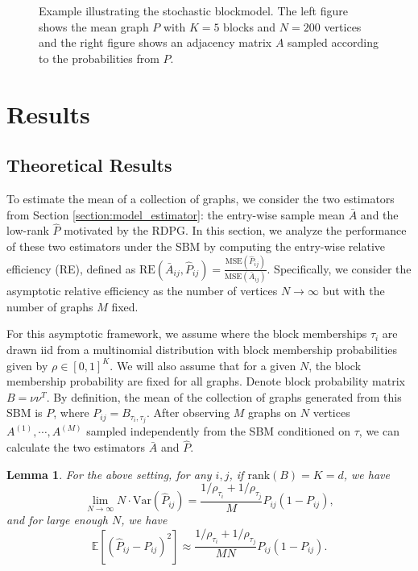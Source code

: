 \documentclass[a4paper]{article}
\newtheorem{lemma}[fact]{Lemma}
\newcommand{\Ex}{\mathbb{E}}
\begin{document}
\begin{figure}
\begin{subfigure}{.5\textwidth}
\end{subfigure}
\caption{Example illustrating the stochastic blockmodel. The left figure shows the mean graph $P$ with $K = 5$ blocks and $N=200$ vertices and the right figure shows an adjacency matrix $A$ sampled according to the probabilities from $P$.}
\label{fig:SBM_example}
\end{figure}



\section{Results}

\subsection{Theoretical Results}
\label{section:theoretical_result}
To estimate the mean of a collection of graphs, we consider the two estimators from Section \ref{section:model_estimator}: the entry-wise sample mean $\bar{A}$ and the low-rank $\hat{P}$ motivated by the RDPG.
In this section, we analyze the performance of these two estimators under the SBM by computing the entry-wise relative efficiency (RE), defined as $\mathrm{RE}(\bar{A}_{ij}, \hat{P}_{ij}) = \frac{\mathrm{MSE}(\hat{P}_{ij})}{\mathrm{MSE}(\bar{A}_{ij})}$.
Specifically, we consider the asymptotic relative efficiency as the number of vertices $N\to\infty$ but with the number of graphs $M$ fixed.

For this asymptotic framework, we assume where the block memberships $\tau_i$ are drawn iid from a multinomial distribution with block membership probabilities given by $\rho\in[0,1]^K$.
We will also assume that for a given $N$, the block membership probability are fixed for all graphs.
Denote block probability matrix $B = \nu \nu^T$. 
By definition, the mean of the collection of graphs generated from this SBM is $P$, where $P_{ij} = B_{\tau_i, \tau_j}$. After observing $M$ graphs on $N$ vertices $A^{(1)}, \cdots, A^{(M)}$ sampled independently from the SBM conditioned on $\tau$, we can calculate the two estimators $\bar{A}$ and $\hat{P}$.

\begin{lemma}
\label{lm:VarPhat}
For the above setting, for any $i, j$, if $\mathrm{rank}(B)=K=d$, we have
\[
	\lim_{N \to \infty} N \cdot \mathrm{Var}(\hat{P}_{ij}) =
    \frac{1/\rho_{\tau_i} + 1/\rho_{\tau_j}}{M} P_{ij} (1 - P_{ij}),
\]
and for large enough $N$, we have
\[
	\Ex[(\hat{P}_{ij} - P_{ij})^2] \approx
    \frac{1/\rho_{\tau_i} + 1/\rho_{\tau_j}}{M N} P_{ij}(1-P_{ij}).
\]
\end{lemma}
\end{document}
